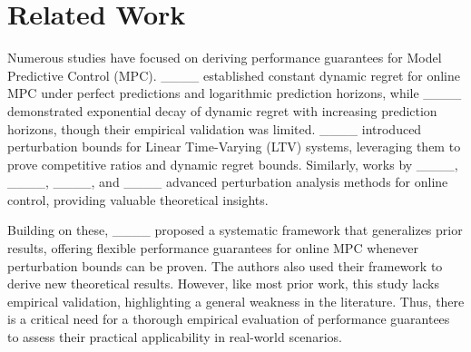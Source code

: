 \section{Related Work}
Numerous studies have focused on deriving performance guarantees for Model Predictive Control (MPC). ____ established constant dynamic regret for online MPC under perfect predictions and logarithmic prediction horizons, while ____ demonstrated exponential decay of dynamic regret with increasing prediction horizons, though their empirical validation was limited. ____ introduced perturbation bounds for Linear Time-Varying (LTV) systems, leveraging them to prove competitive ratios and dynamic regret bounds. Similarly, works by ____, ____, ____, and ____ advanced perturbation analysis methods for online control, providing valuable theoretical insights.

Building on these, ____ proposed a systematic framework that generalizes prior results, offering flexible performance guarantees for online MPC whenever perturbation bounds can be proven. The authors also used their framework to derive new theoretical results. However, like most prior work, this study lacks empirical validation, highlighting a general weakness in the literature. Thus, there is a critical need for a thorough empirical evaluation of performance guarantees to assess their practical applicability in real-world scenarios.
